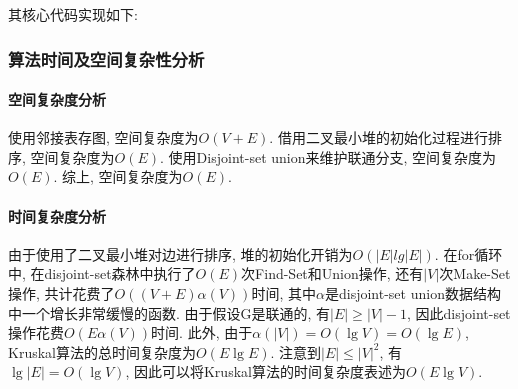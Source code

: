 其核心代码实现如下:


\subsubsection{算法时间及空间复杂性分析}
\paragraph{空间复杂度分析}
使用邻接表存图, 空间复杂度为$O(V+E)$. 借用二叉最小堆的初始化过程进行排序,
空间复杂度为$O(E)$. 使用Disjoint-set union来维护联通分支, 空间复杂度为$O(E)$.
综上, 空间复杂度为$O(E)$.

\paragraph{时间复杂度分析}
由于使用了二叉最小堆对边进行排序, 堆的初始化开销为$O(|E|lg|E|)$. 在for循环中,
在disjoint-set森林中执行了$O(E)$次Find-Set和Union操作, 还有$|V|$次Make-Set操作,
共计花费了$O((V+E)\alpha (V))$时间, 其中$\alpha$是disjoint-set
union数据结构中一个增长非常缓慢的函数. 由于假设G是联通的, 有$|E|\geq |V|-1$,
因此disjoint-set操作花费$O(E\alpha (V))$时间. 此外, 由于$\alpha(|V|) = O(\lg V)
	= O(\lg E)$, Kruskal算法的总时间复杂度为$O(E\lg E)$. 注意到$|E|\leq |V|^2$,
有$\lg |E| = O(\lg V)$, 因此可以将Kruskal算法的时间复杂度表述为$O(E\lg V)$.


